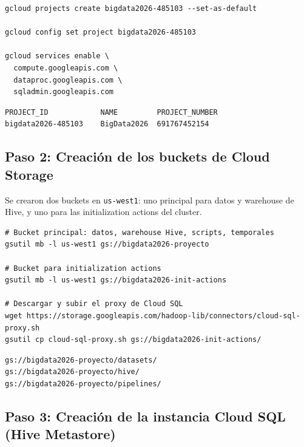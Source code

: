 \documentclass[12pt, letterpaper]{article}
\begin{document}
\begin{lstlisting}[style=codestyle, caption={Creación del proyecto y habilitación de APIs}]
gcloud projects create bigdata2026-485103 --set-as-default

gcloud config set project bigdata2026-485103

gcloud services enable \
  compute.googleapis.com \
  dataproc.googleapis.com \
  sqladmin.googleapis.com
\end{lstlisting}

\begin{lstlisting}[style=outputstyle, caption={Evidencia --- proyecto verificado con \texttt{gcloud projects list}}]
PROJECT_ID            NAME         PROJECT_NUMBER
bigdata2026-485103    BigData2026  691767452154
\end{lstlisting}

\subsection{Paso 2: Creación de los buckets de Cloud Storage}

Se crearon dos buckets en \texttt{us-west1}: uno principal para datos y warehouse de Hive, y uno para las initialization actions del cluster.

\begin{lstlisting}[style=codestyle, caption={Creación de buckets en GCS}]
# Bucket principal: datos, warehouse Hive, scripts, temporales
gsutil mb -l us-west1 gs://bigdata2026-proyecto

# Bucket para initialization actions
gsutil mb -l us-west1 gs://bigdata2026-init-actions

# Descargar y subir el proxy de Cloud SQL
wget https://storage.googleapis.com/hadoop-lib/connectors/cloud-sql-proxy.sh
gsutil cp cloud-sql-proxy.sh gs://bigdata2026-init-actions/
\end{lstlisting}

\begin{lstlisting}[style=outputstyle, caption={Evidencia --- estructura del bucket principal}]
gs://bigdata2026-proyecto/datasets/
gs://bigdata2026-proyecto/hive/
gs://bigdata2026-proyecto/pipelines/
\end{lstlisting}

\subsection{Paso 3: Creación de la instancia Cloud SQL (Hive Metastore)}
\end{document}
